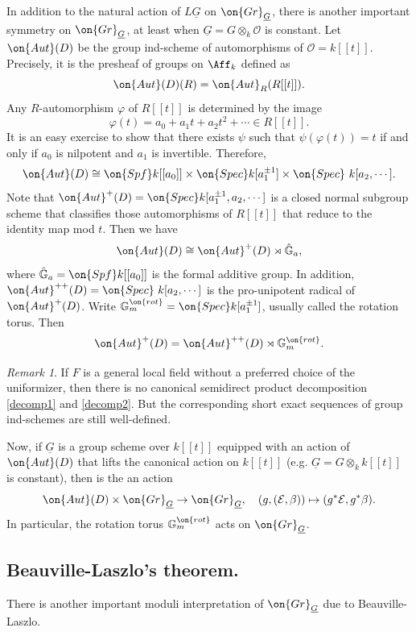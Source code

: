 \documentclass[]{pcmi}
\theoremstyle{plain}
\theoremstyle{remark}
\newtheorem{rmk}[equation]{Remark}
\theoremstyle{definition}
\newcommand{\bG}{{\mathbb G}}
\newcommand{\mE}{{\mathcal E}}
\newcommand{\mO}{{\mathcal O}}
\newcommand{\Aut}{{\on{Aut}}}
\newcommand{\Gr}{{\on{Gr}}}
\newcommand{\Spec}{\on{Spec}}
\begin{document}
In addition to the natural action of $L\underline G$ on $\Gr_{\underline G}$, there is another important symmetry on $\Gr_{\underline G}$, at least when $\underline G=G\otimes_k\mO$ is constant.
Let $\Aut(D)$ be the group ind-scheme of automorphisms of $\mO=k[[t]]$. Precisely, it is the presheaf of groups on $\Aff_k$ defined as
\[\Aut(D)(R)=\Aut_R(R[[t]]).\]
Any $R$-automorphism $\varphi$ of $R[[t]]$ is determined by the image $$\varphi(t)=a_0+a_1t+a_2t^2+\cdots\in R[[t]].$$ It is an easy exercise to show that there exists $\psi$ such that $\psi(\varphi(t))=t$ if and only if $a_0$ is nilpotent and $a_1$ is invertible. Therefore,
\[\Aut(D)\cong \on{Spf} k[[a_0]] \times \Spec k[a_1^{\pm 1}]\times \Spec\ k[a_2,\cdots].\]
Note that $\Aut^+(D)=\Spec k[a_1^{\pm 1},a_2,\cdots]$ is a closed normal subgroup scheme that classifies those automorphisms of $R[[t]]$ that reduce to the identity map mod $t$. Then we have
\begin{equation}\label{decomp1}
\Aut(D)\cong \Aut^+(D)\rtimes \hat{\bG}_a,
\end{equation}
where $\hat{\bG}_a=\on{Spf} k[[a_0]]$ is the formal additive group. In addition, $\Aut^{++}(D)=\Spec\ k[a_2,\cdots]$ is the pro-unipotent radical of $\Aut^+(D)$. Write $\bG_m^{\on{rot}}=\Spec k[a_1^{\pm 1}]$, usually called the rotation torus. Then
\begin{equation}\label{decomp2}
\Aut^+(D)=\Aut^{++}(D)\rtimes \bG_m^{\on{rot}}.
\end{equation}
\begin{rmk}
If $F$ is a general local field without a preferred choice of the uniformizer, then there is no canonical semidirect product decomposition \eqref{decomp1} and \eqref{decomp2}. But the corresponding short exact sequences of group ind-schemes are still well-defined.
\end{rmk}

Now, if $\underline G$ is a group scheme over $k[[t]]$ equipped with an action of $\Aut(D)$ that lifts the canonical action on $k[[t]]$ (e.g. $\underline G=G\otimes_k k[[t]]$ is constant), then is the an action
\begin{equation}\label{auto of disc}
\Aut(D)\times \Gr_{\underline G}\to \Gr_{\underline G},\quad (g, (\mE,\beta))\mapsto (g^*\mE,g^*\beta).
\end{equation}
In particular, the rotation torus $\bG_m^{\on{rot}}$ acts on $\Gr_{\underline G}$.


\subsection{Beauville-Laszlo's theorem.}
There is another important moduli interpretation of $\Gr_{\underline G}$ due to Beauville-Laszlo. 
\end{document}
